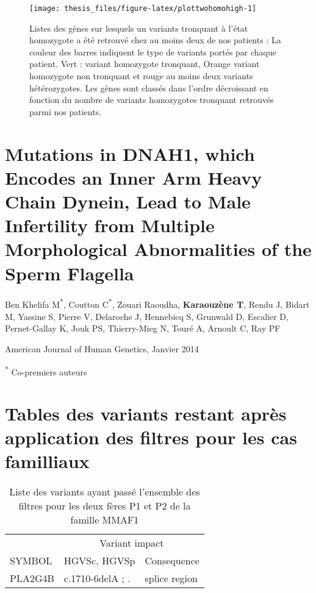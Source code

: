 \documentclass[12pt,twoside]{reedthesis}
\theoremstyle{definition}
\theoremstyle{definition}
\theoremstyle{remark}
\begin{document}
  \begin{figure}
  
  {\centering \texttt{[image: thesis\_files/figure-latex/plottwohomohigh-1]} 
  
  }
  
  \caption[Listes des gènes sur lesquels un variants tronquant à l'état homozygote a été retrouvé chez au moins deux de nos patients]{Listes des gènes sur lesquels un variants tronquant à l'état homozygote a été retrouvé chez au moins deux de nos patients : La couleur des barres indiquent le type de variants portés par chaque patient. Vert : variant homozygote tronquant, Orange variant homozygote non tronquant et rouge au moins deux variants hétérozygotes. Les gènes sont classés dans l'ordre décroissant en fonction du nombre de variants homozygotes tronquant retrouvés parmi nos patients.}\label{fig:plottwohomohigh}
  \end{figure}
  
  \appendix
  
  \hypertarget{dnah12014}{\chapter{Mutations in DNAH1, which Encodes an
  Inner Arm Heavy Chain Dynein, Lead to Male Infertility from Multiple
  Morphological Abnormalities of the Sperm Flagella}\label{dnah12014}}
  
  Ben Khelifa M\textsuperscript{*}, Coutton C\textsuperscript{*}, Zouari
  Raoudha, \textbf{Karaouzène T}, Rendu J, Bidart M, Yassine S, Pierre V,
  Delaroche J, Hennebicq S, Grunwald D, Escalier D, Pernet-Gallay K, Jouk
  PS, Thierry-Mieg N, Touré A, Arnoult C, Ray PF
  
  American Journal of Human Genetics, Janvier 2014
  
  \textsuperscript{*} Co-premiers auteurs
  
  \newpage
  
  
  
  \newpage
  
  \newpage
  
  \chapter{Tables des variants restant après application des filtres pour
  les cas
  familliaux}\label{tables-des-variants-restant-apres-application-des-filtres-pour-les-cas-familliaux}
  
  \begin{longtable}[t]{lll}
  \caption{\label{tab:tabmmaf1}Liste des variants ayant passé l'ensemble des filtres pour les deux fères P1 et P2 de la famille MMAF1}\\
  \toprule
  \multicolumn{1}{c}{ } & \multicolumn{2}{c}{Variant impact} \\
  \cmidrule(l{2pt}r{2pt}){2-3}
  SYMBOL & HGVSc, HGVSp & Consequence\\
  \midrule
  PLA2G4B & c.1710-6delA ; . & splice region\\
  \bottomrule
  \end{longtable}
  
\end{document}
